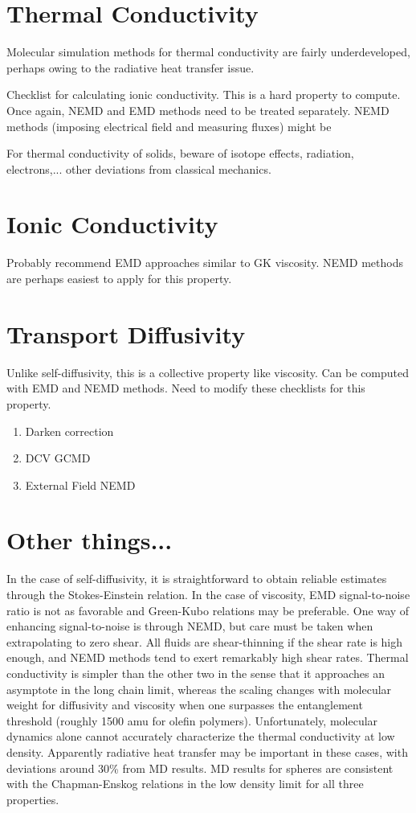 \documentclass[9pt]{livecoms}
\begin{document}
\section{Thermal Conductivity}

Molecular simulation methods for thermal conductivity are fairly underdeveloped, perhaps owing to the radiative heat transfer issue.

Checklist for calculating ionic conductivity. This is a hard property to compute. Once again, NEMD and EMD methods need to be treated separately. NEMD methods (imposing electrical field and measuring fluxes) might be 

For thermal conductivity of solids, beware of isotope effects, radiation, electrons,... other deviations from classical mechanics. 


\section{Ionic Conductivity}

Probably recommend EMD approaches similar to GK viscosity. NEMD methods are perhaps easiest to apply for this property.

\section{Transport Diffusivity}

Unlike self-diffusivity, this is a collective property like viscosity. Can be computed with EMD and NEMD methods. Need to modify these checklists for this property. 

\begin{enumerate}
	\item Darken correction
	\item DCV GCMD
	\item External Field NEMD
\end{enumerate}

\section{Other things...}

In the case of self-diffusivity, it is straightforward to obtain reliable estimates through the Stokes-Einstein relation. In the case of viscosity, EMD signal-to-noise ratio is not as favorable and Green-Kubo relations may be preferable. One way of enhancing signal-to-noise is through NEMD, but care must be taken when extrapolating to zero shear. All fluids are shear-thinning if the shear rate is high enough, and NEMD methods tend to exert remarkably high shear rates. Thermal conductivity is simpler than the other two in the sense that it approaches an asymptote in the long chain limit, whereas the scaling changes with molecular weight for diffusivity and viscosity when one surpasses the entanglement threshold (roughly 1500 amu for olefin polymers). Unfortunately, molecular dynamics alone cannot accurately characterize the thermal conductivity at low density. Apparently radiative heat transfer may be important in these cases, with deviations around 30\% from MD results. MD results for spheres are consistent with the Chapman-Enskog relations in the low density limit for all three properties.
\end{document}
